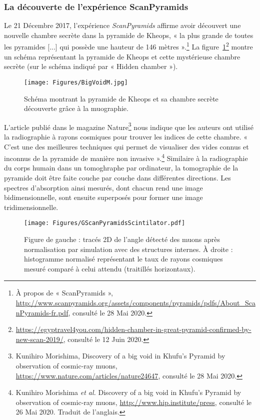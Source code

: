 \documentclass[a4paper, 12pt]{article}
\begin{document}
\begin{spacing}{1.5}
\subsubsection{La découverte de l'expérience ScanPyramids}
\label{subsubsection:ScanPyramids}

Le 21 Décembre 2017, l'expérience \emph{ScanPyramids} affirme avoir découvert une nouvelle chambre secrète dans la pyramide de Kheops, « la plus grande de toutes les pyramides [...] qui possède une hauteur de 146 mètres ».\footnote{À propos de « ScanPyramids », \url{http://www.scanpyramids.org/assets/components/pyramids/pdfs/About_ScanPyramids-fr.pdf}, consulté le 28 Mai 2020.} La figure~\ref{fig:BigVoidM}\footnote{\url{https://egyptravel4you.com/hidden-chamber-in-great-pyramid-confirmed-by-new-scan-2019/}, consulté le 12 Juin 2020.} montre un schéma représentant la pyramide de Kheops et cette mystérieuse chambre secrète (sur le schéma indiqué par « Hidden chamber »).

\begin{figure}[t]
\begin{center}
\texttt{[image: Figures/BigVoidM.jpg]}
\caption{\label{fig:BigVoidM} Schéma montrant la pyramide de Kheops et sa chambre secrète découverte grâce à la muographie.}
\end{center}
\end{figure}


L'article publié dans le magazine Nature\footnote{Kunihiro Morishima, Discovery of a big void in Khufu’s Pyramid by observation of cosmic-ray muons, \url{https://www.nature.com/articles/nature24647}, consulté le 28 Mai 2020.} nous indique que les auteurs ont utilisé la radiographie à rayons cosmiques pour trouver les indices de cette chambre. « C'est une des meilleures techniques qui permet de visualiser des vides connus et inconnus de la pyramide de manière non invasive ».\footnote{Kunihiro Morishima \emph{et al.} Discovery of a big void in Khufu's Pyramid by observation of cosmic-ray muons, \url{http://www.hip.institute/press}, consulté le 26 Mai 2020. Traduit de l'anglais.} Similaire à la radiographie du corps humain dans un tomoghraphe par ordinateur, la tomographie de la pyramide doit être faite couche par couche dans différentes directions. Les spectres d'absorption ainsi mesurés, dont chacun rend une image bidimensionnelle, sont ensuite superposés pour former une image tridimensionnelle. 

\begin{figure}[t]
\begin{center}
\texttt{[image: Figures/GScanPyramidsScintilator.pdf]}
\caption{\label{fig:GScanPyramidsScintilator} Figure de gauche : tracés 2D de l'angle détecté des muons après normalisation par simulation avec des structures internes. À droite : histogramme normalisé représentant le taux de rayons cosmiques mesuré comparé à celui attendu (traitillés horizontaux).}
\end{center}
\end{figure}


\end{spacing}
\end{document}
